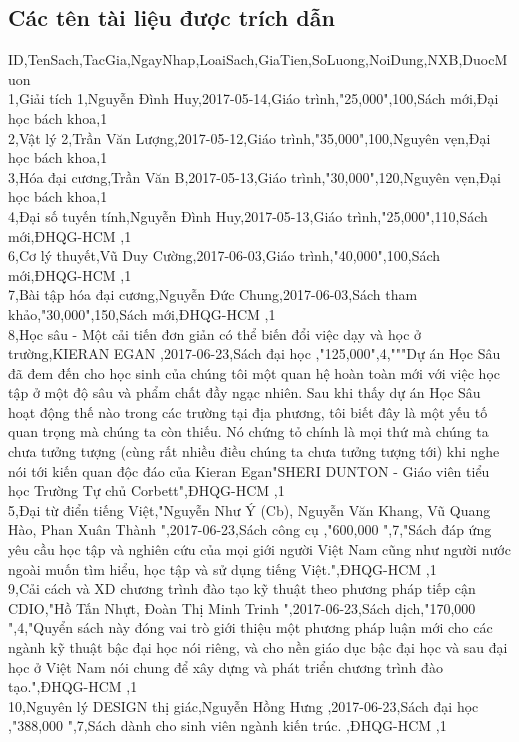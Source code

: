 \documentclass[a4paper]{article}
\begin{document}
\subsection{Các tên tài liệu được trích dẫn}
ID,TenSach,TacGia,NgayNhap,LoaiSach,GiaTien,SoLuong,NoiDung,NXB,DuocMuon\\
1,Giải tích 1,Nguyễn Đình Huy,2017-05-14,Giáo trình,"25,000",100,Sách mới,Đại học bách khoa,1\\
2,Vật lý 2,Trần Văn Lượng,2017-05-12,Giáo trình,"35,000",100,Nguyên vẹn,Đại học bách khoa,1\\
3,Hóa đại cương,Trần Văn B,2017-05-13,Giáo trình,"30,000",120,Nguyên vẹn,Đại học bách khoa,1\\
4,Đại số tuyến tính,Nguyễn Đình Huy,2017-05-13,Giáo trình,"25,000",110,Sách mới,ĐHQG-HCM ,1\\
6,Cơ lý thuyết,Vũ Duy Cường,2017-06-03,Giáo trình,"40,000",100,Sách mới,ĐHQG-HCM ,1\\
7,Bài tập hóa đại cương,Nguyễn Đức Chung,2017-06-03,Sách tham khảo,"30,000",150,Sách mới,ĐHQG-HCM ,1\\
8,Học sâu - Một cải tiến đơn giản có thể biến đổi việc dạy và học ở trường,KIERAN EGAN ,2017-06-23,Sách đại học ,"125,000",4,"""Dự án Học Sâu đã đem đến cho học sinh của chúng tôi một quan hệ hoàn toàn mới với việc học tập ở một độ sâu và phẩm chất đầy ngạc nhiên. Sau khi thấy dự án Học Sâu hoạt động thế nào trong các trường tại địa phương, tôi biết đây là một yếu tố quan trọng mà chúng ta còn thiếu. Nó chứng tỏ chính là mọi thứ mà chúng ta chưa tưởng tượng (cùng rất nhiều điều chúng ta chưa tưởng tượng tới) khi nghe nói tới kiến quan độc đáo của Kieran Egan"SHERI DUNTON - Giáo viên tiểu học Trường Tự chủ Corbett",ĐHQG-HCM ,1\\
5,Đại từ điển tiếng Việt,"Nguyễn Như Ý (Cb), Nguyễn Văn Khang, Vũ Quang Hào, Phan Xuân Thành ",2017-06-23,Sách công cụ ,"600,000 ",7,"Sách đáp ứng yêu cầu học tập và nghiên cứu của mọi giới người Việt Nam cũng như người nước ngoài muốn tìm hiểu, học tập và sử dụng tiếng Việt.",ĐHQG-HCM ,1\\
9,Cải cách và XD chương trình đào tạo kỹ thuật theo phương pháp tiếp cận CDIO,"Hồ Tấn Nhựt, Đoàn Thị Minh Trinh ",2017-06-23,Sách dịch,"170,000 ",4,"Quyển sách này đóng vai trò giới thiệu một phương pháp luận mới cho các ngành kỹ thuật bậc đại học nói riêng, và cho nền giáo dục bậc đại học và sau đại học ở Việt Nam nói chung để xây dựng và phát triển chương trình đào tạo.",ĐHQG-HCM ,1\\
10,Nguyên lý DESIGN thị giác,Nguyễn Hồng Hưng ,2017-06-23,Sách đại học ,"388,000 ",7,Sách dành cho sinh viên ngành kiến trúc. ,ĐHQG-HCM ,1\\
\end{document}

